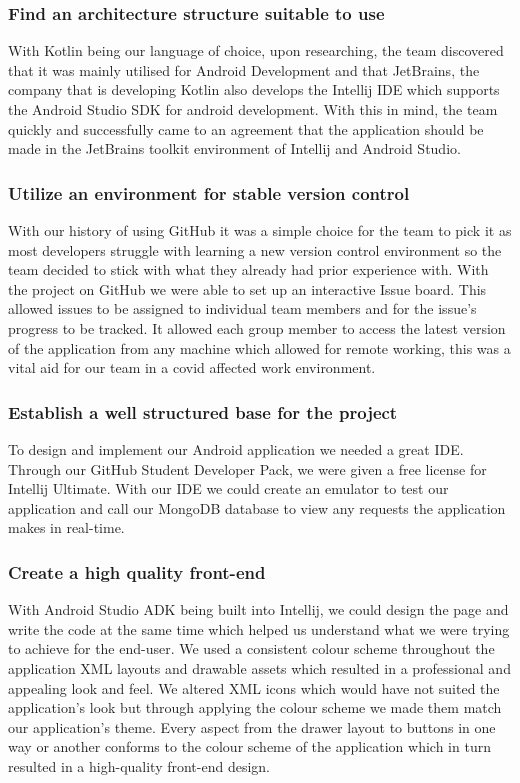 \subsubsection {Find an architecture structure suitable to use}
With Kotlin being our language of choice, upon researching, the team discovered that it was mainly utilised for Android Development and that JetBrains, the company that is developing Kotlin also develops the Intellij IDE which supports the Android Studio SDK for android development. With this in mind, the team quickly and successfully came to an agreement that the application should be made in the JetBrains toolkit environment of Intellij and Android Studio.
\subsubsection {Utilize an environment for stable version control}
With our history of using GitHub it was a simple choice for the team to pick it as most developers struggle with learning a new version control environment so the team decided to stick with what they already had prior experience with. With the project on GitHub we were able to set up an interactive Issue board. This allowed issues to be assigned to individual team members and for the issue's progress to be tracked. It allowed each group member to access the latest version of the application from any machine which allowed for remote working, this was a vital aid for our team in a covid affected work environment.
\subsubsection {Establish a well structured base for the project}
To design and implement our Android application we needed a great IDE. Through our GitHub Student Developer Pack, we were given a free license for Intellij Ultimate. With our IDE we could create an emulator to test our application and call our MongoDB database to view any requests the application makes in real-time.
\subsubsection {Create a high quality front-end}
With Android Studio ADK being built into Intellij, we could design the page and write the code at the same time which helped us understand what we were trying to achieve for the end-user. We used a consistent colour scheme throughout the application XML layouts and drawable assets which resulted in a professional and appealing look and feel. We altered XML icons which would have not suited the application's look but through applying the colour scheme we made them match our application's theme. Every aspect from the drawer layout to buttons in one way or another conforms to the colour scheme of the application which in turn resulted in a high-quality front-end design.
